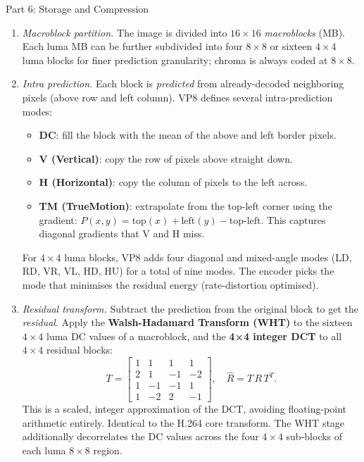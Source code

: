 \documentclass[letterpaper]{article}
\begin{document}
\begin{notes}{Part 6: Storage and Compression}
\begin{enumerate}
    \item \textit{Macroblock partition.} The image is divided into $16\times16$ \emph{macroblocks} (MB). Each luma MB can be further subdivided into four $8\times8$ or sixteen $4\times4$ luma blocks for finer prediction granularity; chroma is always coded at $8\times8$.

    \item \textit{Intra prediction.} Each block is \emph{predicted} from already-decoded neighboring pixels (above row and left column). VP8 defines several intra-prediction modes:
    \begin{itemize}
        \item \textbf{DC}: fill the block with the mean of the above and left border pixels.
        \item \textbf{V (Vertical)}: copy the row of pixels above straight down.
        \item \textbf{H (Horizontal)}: copy the column of pixels to the left across.
        \item \textbf{TM (TrueMotion)}: extrapolate from the top-left corner using the gradient: $P(x,y) = \text{top}(x) + \text{left}(y) - \text{top-left}$. This captures diagonal gradients that V and H miss.
    \end{itemize}
    For $4\times4$ luma blocks, VP8 adds four diagonal and mixed-angle modes (LD, RD, VR, VL, HD, HU) for a total of nine modes. The encoder picks the mode that minimises the residual energy (rate-distortion optimised).\\
    
    \item \textit{Residual transform.} Subtract the prediction from the original block to get the \emph{residual}. Apply the \textbf{Walsh-Hadamard Transform (WHT)} to the sixteen $4\times4$ luma DC values of a macroblock, and the \textbf{4×4 integer DCT} to all $4\times4$ residual blocks:
    $$T = \begin{bmatrix}1&1&1&1\\2&1&-1&-2\\1&-1&-1&1\\1&-2&2&-1\end{bmatrix}, \quad \hat{R} = T\,R\,T^T.$$
    This is a scaled, integer approximation of the DCT, avoiding floating-point arithmetic entirely. Identical to the H.264 core transform. The WHT stage additionally decorrelates the DC values across the four $4\times4$ sub-blocks of each luma $8\times8$ region.\\
    

\end{enumerate}
\end{notes}
\end{document}
